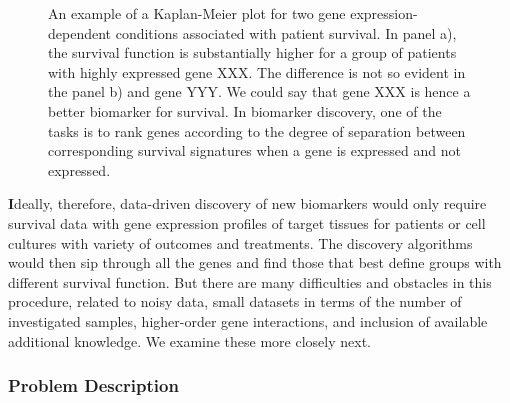 \documentclass[11pt,a4paper]{article}
\renewcommand{\bf}{\textbf}
\begin{document}
\begin{figure}
\caption{An example of a Kaplan-Meier plot for two gene expression-dependent conditions associated with patient survival. In panel a), the survival function is substantially higher for a group of patients with highly expressed gene XXX. The difference is not so evident in the panel b) and gene YYY. We could say that gene XXX is hence a better biomarker for survival. In biomarker discovery, one of the tasks is to rank genes according to the degree of separation between corresponding survival signatures when a gene is expressed and not expressed.}
\label{fig:km-marker}
\end{figure}

{\bf Ideally, therefore, data-driven discovery of new biomarkers would only require survival data with gene expression profiles of target tissues for patients or cell cultures with variety of outcomes and treatments.} The discovery algorithms would then sip through all the genes and find those that best define groups with different survival function. But there are many difficulties and obstacles in this procedure, related to noisy data, small datasets in terms of the number of investigated samples, higher-order gene interactions, and inclusion of available additional knowledge. We examine these more closely next.

\subsubsection*{Problem Description}
\end{document}

